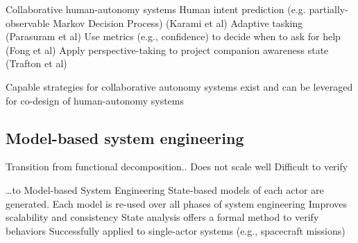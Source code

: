 Collaborative human-autonomy systems
Human intent prediction (e.g. partially-observable Markov Decision Process) (Karami et al)
Adaptive tasking (Parasuram et al)
Use metrics (e.g., confidence) to decide when to ask for help (Fong et al) 
Apply perspective-taking to project companion awareness state (Trafton et al)


Capable strategies for collaborative autonomy systems exist and can be 
leveraged for co-design of human-autonomy systems


\subsection*{Model-based system engineering}


Transition from functional decomposition..
Does not scale well
Difficult to verify


…to Model-based System Engineering 
State-based models of each actor are generated.
Each model is re-used over all phases of system engineering
Improves scalability and consistency
State analysis offers a formal method to verify behaviors
Successfully applied to single-actor systems (e.g., spacecraft missions)


